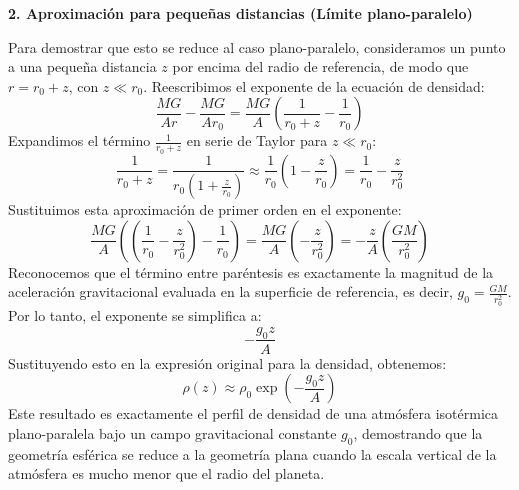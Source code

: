\textbf{2. Aproximación para pequeñas distancias (Límite plano-paralelo)}

Para demostrar que esto se reduce al caso plano-paralelo, consideramos un punto a una pequeña distancia $z$ por encima del radio de referencia, de modo que $r = r_0 + z$, con $z \ll r_0$.
Reescribimos el exponente de la ecuación de densidad:
$$ \frac{MG}{Ar} - \frac{MG}{Ar_0} = \frac{MG}{A} \left( \frac{1}{r_0 + z} - \frac{1}{r_0} \right) $$
Expandimos el término $\frac{1}{r_0 + z}$ en serie de Taylor para $z \ll r_0$:
$$ \frac{1}{r_0 + z} = \frac{1}{r_0\left(1 + \frac{z}{r_0}\right)} \approx \frac{1}{r_0} \left( 1 - \frac{z}{r_0} \right) = \frac{1}{r_0} - \frac{z}{r_0^2} $$
Sustituimos esta aproximación de primer orden en el exponente:
$$ \frac{MG}{A} \left( \left(\frac{1}{r_0} - \frac{z}{r_0^2}\right) - \frac{1}{r_0} \right) = \frac{MG}{A} \left( - \frac{z}{r_0^2} \right) = - \frac{z}{A} \left( \frac{GM}{r_0^2} \right) $$
Reconocemos que el término entre paréntesis es exactamente la magnitud de la aceleración gravitacional evaluada en la superficie de referencia, es decir, $g_0 = \frac{GM}{r_0^2}$. Por lo tanto, el exponente se simplifica a:
$$ - \frac{g_0 z}{A} $$
Sustituyendo esto en la expresión original para la densidad, obtenemos:
$$ \rho(z) \approx \rho_0 \exp\left(-\frac{g_0 z}{A}\right) $$
Este resultado es exactamente el perfil de densidad de una atmósfera isotérmica plano-paralela bajo un campo gravitacional constante $g_0$, demostrando que la geometría esférica se reduce a la geometría plana cuando la escala vertical de la atmósfera es mucho menor que el radio del planeta.